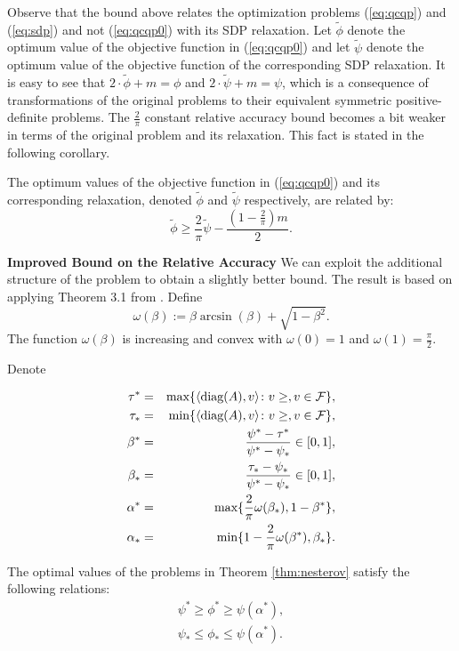 Observe that the bound above relates the optimization problems (\ref{eq:qcqp}) and (\ref{eq:sdp})
and not (\ref{eq:qcqp0}) with its SDP relaxation. Let $\widetilde{\phi}$ denote the optimum value
of the objective function in (\ref{eq:qcqp0}) and let $\widetilde{\psi}$ denote the optimum value
of the objective function of the corresponding SDP relaxation. It is easy to see that
$2 \cdot \widetilde{\phi} + m = \phi$ and $2 \cdot \widetilde{\psi} + m = \psi$, which is a
consequence of transformations of the original problems to their equivalent symmetric
positive-definite problems. The $\frac{2}{\pi}$ constant relative accuracy bound becomes a bit
weaker in terms of the original problem and its relaxation. This fact is stated in the following corollary.
\begin{corollary}
The optimum values of the objective function in (\ref{eq:qcqp0}) and its corresponding relaxation,
denoted $\widetilde{\phi}$ and $\widetilde{\psi}$ respectively, are related by:
$$\widetilde{\phi} \geq \frac{2}{\pi} \widetilde{\psi} - \frac{(1 - \frac{2}{\pi}) m}{2}.$$
\end{corollary}

\noindent\textbf{Improved Bound on the Relative Accuracy}
We can exploit the additional structure of the problem to obtain a slightly better bound.
The result is based on applying Theorem 3.1 from \cite{Nesterov98globalquadratic}.
Define
$$\omega\left(\beta\right) := \beta \arcsin\left(\beta\right) + \sqrt{1 - \beta^2}.$$
The function $\omega\left(\beta\right)$ is increasing and convex with
$\omega\left(0\right) = 1$ and $\omega\left(1\right) = \frac{\pi}{2}$.

\begin{theorem}\label{thm:nesterov2}
Denote

\begin{align*}
\tau^* &=&  \textnormal{max}\{ \langle \textnormal{diag}(A),v \rangle \colon v \geq, v \in \mathcal{F}  \}, \\
\tau_* &=& \textnormal{min}\{ \langle \textnormal{diag}(A),v \rangle \colon v \geq, v \in \mathcal{F}  \}, \\
\beta^* &=& \frac{\psi^* - \tau^*}{\psi^*-\psi_*} \in [0,1], \\
\beta_* &=& \frac{\tau_* - \psi_*}{\psi^*-\psi_*} \in [0,1], \\
\alpha^* &=& \textnormal{max}\{\frac{2}{\pi}\omega(\beta_*), 1 - \beta^* \}, \\
\alpha_* &=& \textnormal{min}\{1 - \frac{2}{\pi}\omega(\beta^*), \beta_* \}.
\end{align*}

The optimal values of the problems in Theorem \ref{thm:nesterov} satisfy the following relations:
\begin{align*}
\psi^* \geq \phi^* \geq \psi(\alpha^*), \\
\psi_* \leq \phi_* \leq \psi(\alpha^*). \\
\end{align*}
\end{theorem}


